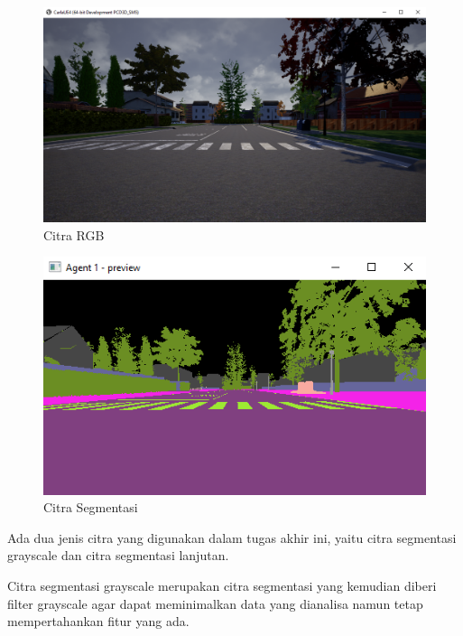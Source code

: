 \documentclass[conference]{IEEEtran}
\begin{document}
\begin{figure}[H] 
	\centering
	\includegraphics[width=1\linewidth]{images/rgb}
	\caption{Citra RGB}
	\label{fig:citra_rgb}
\end{figure}
\begin{figure}[H] 
	\centering
	\includegraphics[width=1\linewidth]{images/segmentasi}
	\caption{Citra Segmentasi}
	\label{fig:segmentasi}
\end{figure}
Ada dua jenis citra yang digunakan dalam tugas akhir ini, yaitu citra segmentasi grayscale dan citra segmentasi lanjutan.

Citra segmentasi grayscale merupakan citra segmentasi yang kemudian diberi filter grayscale agar dapat meminimalkan data yang dianalisa namun tetap mempertahankan fitur yang ada.
\end{document}
